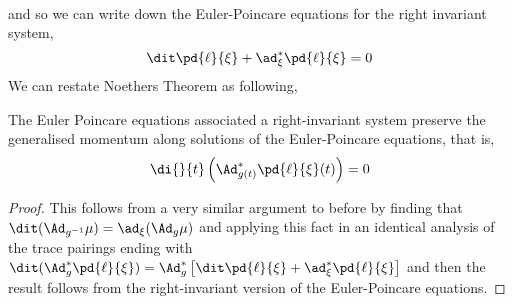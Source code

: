 {\begin{solution}
\begin{align*}
  \end{align*}
  and so we can write down the Euler-Poincare equations for the right invariant system,
  $$ \dit\pd{\ell}{\xi} + \ad^*_\xi \pd{\ell}{\xi} = 0 $$
  We can restate Noethers Theorem as following,
  \begin{nthm}
    The Euler Poincare equations associated a right-invariant system preserve the generalised momentum along solutions of the Euler-Poincare equations, that is,
    $$ \di{}{t} \left(\Ad^*_{g(t)}\pd{\ell}{\xi}(t)\right) = 0 $$
  \end{nthm}
  \begin{proof}
    This follows from a very similar argument to before by finding that $\dit (\Ad_{g^{-1}}\mu) = \ad_\xi (\Ad_g\mu)$ and applying this fact in an identical analysis of the trace pairings ending with $\dit(\Ad_g^*\pd{\ell}{\xi}) = \Ad^*_g\left[ \dit\pd{\ell}{\xi} + \ad_\xi^* \pd{\ell}{\xi} \right]$ and then the result follows from the right-invariant version of the Euler-Poincare equations.
  \end{proof}
\end{solution} }
